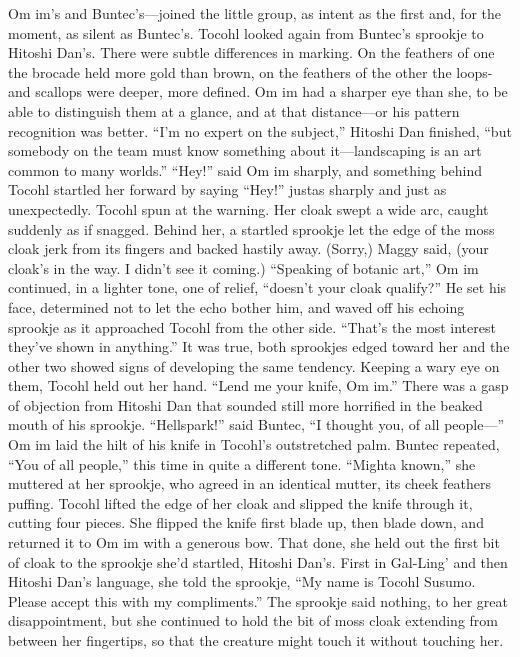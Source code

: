 \documentclass[9pt]{article}
\begin{document}
Om im’s and Buntec’s—joined the little group, as intent as the first and, for the moment, as silent as
Buntec’s.
Tocohl looked again from Buntec’s sprookje to Hitoshi Dan’s. There were subtle differences in
marking. On the feathers of one the brocade held more gold than brown, on the feathers of the other the
loops-and scallops were deeper, more defined. Om im had a sharper eye than she, to be able to
distinguish them at a glance, and at that distance—or his pattern recognition was better.
“I’m no expert on the subject,” Hitoshi Dan finished, “but somebody on the team must know
something about it—landscaping is an art common to many worlds.”
“Hey!” said Om im sharply, and something behind Tocohl startled her forward by saying “Hey!” justas sharply and just as unexpectedly.
Tocohl spun at the warning. Her cloak swept a wide arc, caught suddenly as if snagged. Behind her,
a startled sprookje let the edge of the moss cloak jerk from its fingers and backed hastily away.
(Sorry,) Maggy said, (your cloak’s in the way. I didn’t see it coming.)
“Speaking of botanic art,” Om im continued, in a lighter tone, one of relief, “doesn’t your cloak
qualify?” He set his face, determined not to let the echo bother him, and waved off his echoing sprookje
as it approached Tocohl from the other side. “That’s the most interest they’ve shown in anything.”
It was true, both sprookjes edged toward her and the other two showed signs of developing the
same tendency. Keeping a wary eye on them, Tocohl held out her hand. “Lend me your knife, Om im.”
There was a gasp of objection from Hitoshi Dan that sounded still more horrified in the beaked
mouth of his sprookje. “Hellspark!” said Buntec, “I thought you, of all people—”
Om im laid the hilt of his knife in Tocohl’s outstretched palm.
Buntec repeated, “You of all people,” this time in quite a different tone. “Mighta known,” she
muttered at her sprookje, who agreed in an identical mutter, its cheek feathers puffing.
Tocohl lifted the edge of her cloak and slipped the knife through it, cutting four pieces. She flipped
the knife first blade up, then blade down, and returned it to Om im with a generous bow.
That done, she held out the first bit of cloak to the sprookje she’d startled, Hitoshi Dan’s. First in
Gal-Ling’ and then Hitoshi Dan’s language, she told the sprookje, “My name is Tocohl Susumo. Please
accept this with my compliments.”
The sprookje said nothing, to her great disappointment, but she continued to hold the bit of moss
cloak extending from between her fingertips, so that the creature might touch it without touching her.
\end{document}
